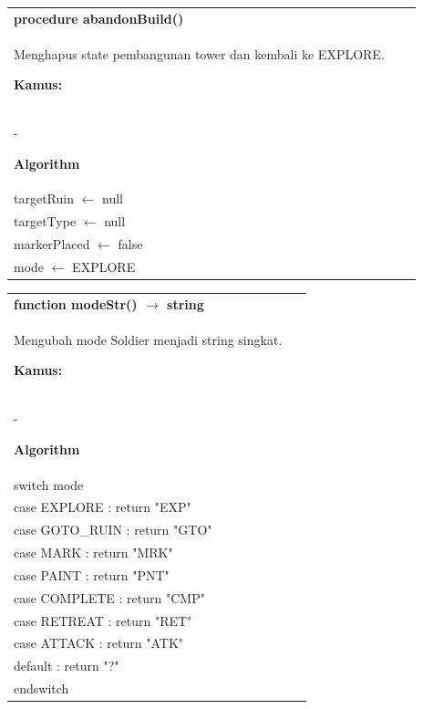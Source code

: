 \documentclass{article}
\newenvironment{pseudobox}
{
\centering
\begin{longtable}{|p{0.94\linewidth}|}
\hline
}
{
\\ \hline
\end{longtable}
\vspace{0.05cm}
}
\begin{document}
\begin{pseudobox}
\textbf{procedure abandonBuild()} \\
{ Menghapus state pembangunan tower dan kembali ke EXPLORE. }

\textbf{Kamus:} \\
\hspace*{1em} -

\textbf{Algorithm} \\
\hspace*{1em} targetRuin $\leftarrow$ null \\
\hspace*{1em} targetType $\leftarrow$ null \\
\hspace*{1em} markerPlaced $\leftarrow$ false \\
\hspace*{1em} mode $\leftarrow$ EXPLORE
\end{pseudobox}

\begin{pseudobox}
\textbf{function modeStr() $\rightarrow$ string} \\
{ Mengubah mode Soldier menjadi string singkat. }

\textbf{Kamus:} \\
\hspace*{1em} -

\textbf{Algorithm} \\
\hspace*{1em} switch mode \\
\hspace*{2em} case EXPLORE   : return "EXP" \\
\hspace*{2em} case GOTO\_RUIN : return "GTO" \\
\hspace*{2em} case MARK      : return "MRK" \\
\hspace*{2em} case PAINT     : return "PNT" \\
\hspace*{2em} case COMPLETE  : return "CMP" \\
\hspace*{2em} case RETREAT   : return "RET" \\
\hspace*{2em} case ATTACK    : return "ATK" \\
\hspace*{2em} default        : return "?" \\
\hspace*{1em} endswitch
\end{pseudobox}
\end{document}
